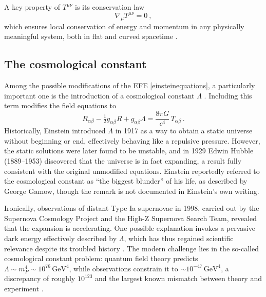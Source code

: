 A key property of $T^{\mu\nu}$ is its conservation law
\begin{equation}
\nabla_\mu T^{\mu\nu} = 0 \ ,
\end{equation}
which ensures local conservation of energy and momentum in any physically meaningful system, both in flat and curved spacetime 
\cite{Llibre_Peter_Collier_unacosadificildecomprender}.


\subsection{The cosmological constant}

Among the possible modifications of the EFE \eqref{einsteinequations}, a particularly important one is the introduction of a cosmological constant $\Lambda$ \cite{llibrecarroll2004lectures}. Including this term modifies the field equations to
\begin{equation}
R_{\alpha\beta} - \tfrac{1}{2} g_{\alpha\beta} R + g_{\alpha\beta}\Lambda 
= \frac{8 \pi G}{c^{4}}\, T_{\alpha\beta} \, .
\label{einsteinequationslambda}
\end{equation}
Historically, Einstein introduced $\Lambda$ in 1917 as a way to obtain a static universe without beginning or end, effectively behaving like a repulsive pressure. However, the static solutions were later found to be unstable, and in 1929 Edwin Hubble (1889--1953) discovered that the universe is in fact expanding, a result fully consistent with the 
original unmodified equations. Einstein reportedly referred to the cosmological constant as ``the biggest blunder'' of his life, as described by George Gamow, though the remark is not documented in Einstein's own writing.

Ironically, observations of distant Type Ia supernovae in 1998, carried out by the Supernova Cosmology Project and the High-Z Supernova Search Team, revealed that the expansion is accelerating. One possible explanation invokes a pervasive dark energy effectively described by $\Lambda$, which has thus regained scientific relevance despite its troubled history \cite{Llibre_Peter_Collier_unacosadificildecomprender}. The 
modern challenge lies in the so-called cosmological constant problem: quantum field theory predicts $\Lambda \sim m_{P}^{4} \sim 10^{76}\,\mathrm{GeV}^{4}$, while observations constrain it to $\sim 10^{-47}\,\mathrm{GeV}^{4}$, a discrepancy of roughly $10^{123}$ and the largest known mismatch between theory and experiment \cite{LlibreBertJanssen}. 

